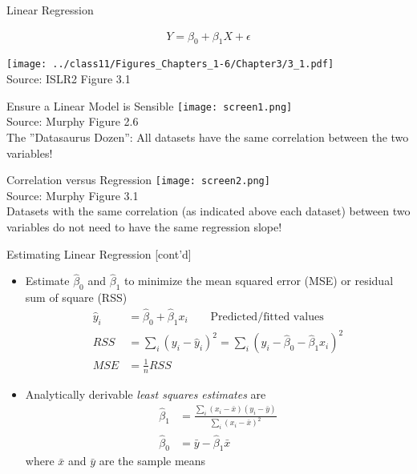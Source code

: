\documentclass[ignorenonframetext,xcolor=x11names]{beamer}
\begin{document}
\begin{frame}{Linear Regression}

\begin{align*}
Y = \beta_0 + \beta_1 X + \epsilon
\end{align*}

\centering

\texttt{[image: ../class11/Figures\_Chapters\_1-6/Chapter3/3\_1.pdf]} \\

\scriptsize Source: ISLR2 Figure 3.1
\end{frame}

\begin{frame}{Ensure a Linear Model is Sensible}
\centering
\texttt{[image: screen1.png]} \\

\scriptsize Source: Murphy Figure 2.6 \\ \vspace{3mm}
\normalsize
The ''Datasaurus Dozen'': All datasets have the same correlation between the two variables!
\end{frame}

\begin{frame}{Correlation versus Regression}
\centering
\texttt{[image: screen2.png]} \\

\scriptsize Source: Murphy Figure 3.1 \\ \vspace{3mm}
\normalsize
Datasets with the same correlation (as indicated above each dataset) between two variables do not need to have the same regression slope!
\end{frame}


\begin{frame}{Estimating Linear Regression \small [cont'd]}
\begin{itemize}
  \item Estimate $\hat{\beta}_0$ and $\hat{\beta}_1$ to minimize the mean squared error (MSE) or residual sum of square (RSS)
\begin{align*}
\hat{y}_i &= \hat{\beta}_0 + \hat{\beta}_1 x_i \qquad \text{Predicted/fitted values} \\
RSS &= \sum_i \left( y_i - \hat{y}_i \right)^2  = \sum_i \left( y_i - \hat{\beta}_0 - \hat{\beta}_1 x_i \right)^2 \\
MSE &= \frac{1}{n} RSS
\end{align*}
  \item Analytically derivable \emph{least squares estimates} are
\begin{align*}
\hat{\beta}_1 &= \frac{\sum_i (x_i - \bar{x})(y_i - \bar{y})} {\sum_i (x_i - \bar{x})^2} \\
\hat{\beta}_0 &= \bar{y} - \hat{\beta}_1 \bar{x}
\end{align*}
where $\bar{x}$ and $\bar{y}$ are the sample means
\end{itemize}
\end{frame}
\end{document}
